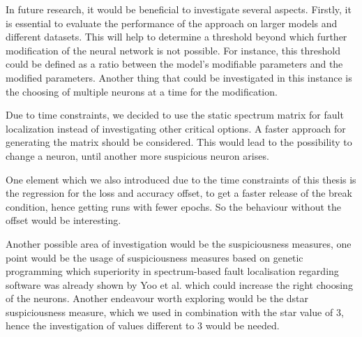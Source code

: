 In future research, it would be beneficial to investigate several aspects.
Firstly, it is essential to evaluate the performance of the approach on larger models and different datasets.
This will help to determine a threshold beyond which further modification of the neural network is not possible.
For instance, this threshold could be defined as a ratio between the model's modifiable parameters and the modified parameters.
Another thing that could be investigated in this instance is the choosing of multiple neurons at a time for the modification.

Due to time constraints, we decided to use the static spectrum matrix for fault localization instead of investigating other critical options.
A faster approach for generating the matrix should be considered.
This would lead to the possibility to change a neuron, until another more suspicious neuron arises.

One element which we also introduced due to the time constraints of this thesis is the regression for the loss and accuracy offset, to get a faster release of the break condition, hence getting runs with fewer epochs.
So the behaviour without the offset would be interesting.

Another possible area of investigation would be the suspiciousness measures, one point would be the usage of suspiciousness measures based on genetic programming which superiority in spectrum-based fault localisation regarding software was already shown by Yoo et al. \cite{yoo_human_2017} which could increase the right choosing of the neurons.
Another endeavour worth exploring would be the dstar suspiciousness measure, which we used in combination with the star value of 3, hence the investigation of values different to 3 would be needed.